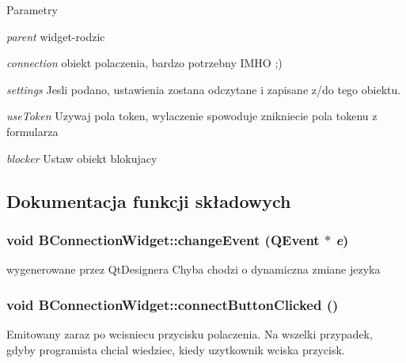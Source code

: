 \begin{DoxyParams}{Parametry}
\item[{\em parent}]widget-\/rodzic \item[{\em connection}]obiekt polaczenia, bardzo potrzebny IMHO ;) \item[{\em settings}]Jesli podano, ustawienia zostana odczytane i zapisane z/do tego obiektu. \item[{\em useToken}]Uzywaj pola token, wylaczenie spowoduje znikniecie pola tokenu z formularza \item[{\em blocker}]Ustaw obiekt blokujacy \end{DoxyParams}


\subsection{Dokumentacja funkcji składowych}
\hypertarget{class_b_connection_widget_a7396f6332ea7735a6a330fc11927d183}{
\subsubsection[{changeEvent}]{\setlength{\rightskip}{0pt plus 5cm}void BConnectionWidget::changeEvent (QEvent $\ast$ {\em e})}}
\label{class_b_connection_widget_a7396f6332ea7735a6a330fc11927d183}


wygenerowane przez QtDesignera Chyba chodzi o dynamiczna zmiane jezyka \hypertarget{class_b_connection_widget_a2eef5117ae0e5b76ca02a86d00fbd70a}{
\subsubsection[{connectButtonClicked}]{\setlength{\rightskip}{0pt plus 5cm}void BConnectionWidget::connectButtonClicked ()}}
\label{class_b_connection_widget_a2eef5117ae0e5b76ca02a86d00fbd70a}


Emitowany zaraz po wcisniecu przycisku polaczenia. Na wszelki przypadek, gdyby programista chcial wiedziec, kiedy uzytkownik wciska przycisk.

